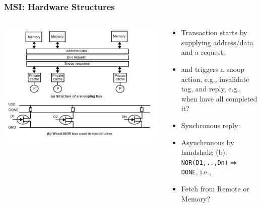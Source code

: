 \documentclass{beamer}
\newcommand{\emp}[1]{\textcolor{DikuRed}{ #1}}
\begin{document}
\begin{frame}[fragile,t]
\frametitle{MSI: Hardware Structures}

\begin{columns}\hspace{-5ex}
\includegraphics[width=47ex]{FigsInfCoherence/SnoopingBus}
\vspace{-3ex}
\begin{scriptsize}
\begin{itemize}
    \item Transaction starts by supplying \emp{address/data} and a \emp{request}.
    \item and triggers a \emp{snoop action}, e.g., invalidate tag, and \emp{reply},
            e.g., when have all completed it?
    \item \emp{Synchronous} reply:  
    \item \emp{Asynchronous} by handshake (b):\\{{\tt NOR(D1,..,Dn)$\Rightarrow$ DONE}}, i.e.,\\
    \item \emp{Fetch from Remote or Memory?}
\end{itemize}
\end{scriptsize}
\end{columns}

\end{frame}
\end{document}
